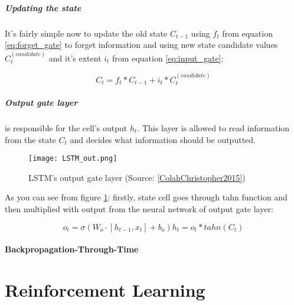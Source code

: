 \subparagraph{Updating the state}
It's fairly simple now to update the old state $C_{t-1}$ using $f_t$ from equation
\ref{eq:forget_gate} to forget information and using new state candidate values
$C_t^{(candidate)}$ and it's extent $i_t$ from equation \ref{eq:input_gate}:

\begin{equation} \label{eq:update_state}
	C_t = f_t * C_{t-1} + i_t * C_t^{(candidate)}
\end{equation}

\subparagraph{Output gate layer} is responsible for the cell's output $h_t$.
This layer is allowed to read information from the state $C_t$ and decides what information
should be outputted.
\begin{figure}[H]
	\texttt{[image: LSTM\_out.png]}
	\caption{
		LSTM's output gate layer (Source: \ref{ColahChristopher2015})
		}
	\label{img:lstm_out}
\end{figure}

As you can see from figure \ref{img:lstm_out}: firstly, state cell goes
through tahn function and then multiplied
with output from the neural network of output gate layer:

\begin{equation} \label{eq:update_state}
	o_t = \sigma (W_o \cdot [h_{t-1}, x_t] + b_o)
	h_t = o_t * tahn(C_t)
\end{equation}


\paragraph{Backpropagation-Through-Time}

\cite{Goodfellow-et-al-2016}


\section{Reinforcement Learning}

%
%





